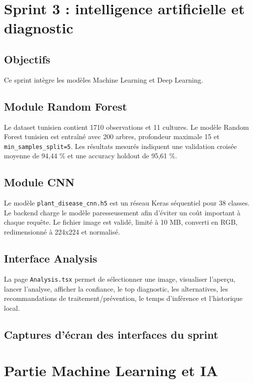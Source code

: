 \section{Sprint 3 : intelligence artificielle et diagnostic}
\subsection{Objectifs}
Ce sprint intègre les modèles Machine Learning et Deep Learning.

\subsection{Module Random Forest}
Le dataset tunisien contient 1710 observations et 11 cultures. Le modèle Random Forest tunisien est entraîné avec 200 arbres, profondeur maximale 15 et \texttt{min\_samples\_split=5}. Les résultats mesurés indiquent une validation croisée moyenne de 94,44 \% et une accuracy holdout de 95,61 \%.

\subsection{Module CNN}
Le modèle \texttt{plant\_disease\_cnn.h5} est un réseau Keras séquentiel pour 38 classes. Le backend charge le modèle paresseusement afin d'éviter un coût important à chaque requête. Le fichier image est validé, limité à 10 MB, converti en RGB, redimensionné à 224x224 et normalisé.

\subsection{Interface Analysis}
La page \texttt{Analysis.tsx} permet de sélectionner une image, visualiser l'aperçu, lancer l'analyse, afficher la confiance, le top diagnostic, les alternatives, les recommandations de traitement/prévention, le temps d'inférence et l'historique local.

\subsection{Captures d'écran des interfaces du sprint}


\section{Partie Machine Learning et IA}
